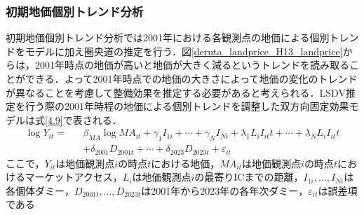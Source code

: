 \subsubsection{初期地価個別トレンド分析}
初期地価個別トレンド分析では2001年における各観測点の地価による個別トレンドをモデルに加え圏央道の推定を行う．図\ref{deruta_landprice_H13_landprice}からは，2001年時点の地価が高いと地価が大きく減るというトレンドを読み取ることができる．よって2001年時点での地価の大きさによって地価の変化のトレンドが異なることを考慮して整備効果を推定する必要があると考えられる．LSDV推定を行う際の2001年時程の地価による個別トレンドを調整した双方向固定効果モデルは式\ref{4.9}で表される．
\begin{eqnarray}
  \log{Y_{it}}= &&\beta_{MA}\log{{MA}_{it}}+ \gamma_{1}I_{1i} + \cdots + \gamma_{N}I_{Ni} + \lambda_{1}L_{i}I_{it}t+ \cdots  + \lambda_{N}L_{i}I_{it}t \nonumber \\
    && + \delta_{2001}D_{2001t} + \cdots + \delta_{2023}D_{2023t} + \varepsilon_{it}
  \label{4.9}
\end{eqnarray}
ここで，$Y_{it}$は地価観測点$i$の時点$t$における地価，$MA_{it}$は地価観測点$i$の時点$t$におけるマーケットアクセス，$L_{i}$は地価観測点$i$の最寄りICまでの距離，$I_{1i},...,I_{Ni}$は各個体ダミー，$D_{2001t},...,D_{2023t}$は2001年から2023年の各年次ダミー，$\varepsilon_{it}$は誤差項である